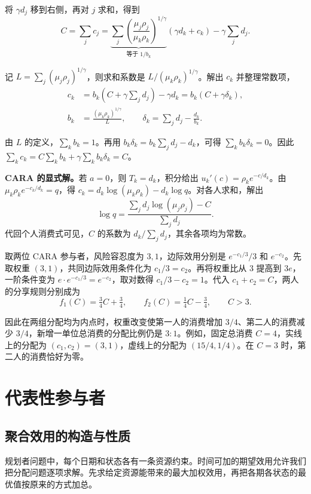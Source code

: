 将 $\gamma d_j$ 移到右侧，再对 $j$ 求和，得到
\[
 C=\sum_j c_j
 =\underbrace{\sum_j\left(\frac{\mu_j\rho_j}{\mu_k\rho_k}\right)^{1/\gamma}}
             _{\text{等于 }1/b_k}
       (\gamma d_k+c_k)-\gamma\sum_j d_j.
\]

记 $L=\sum_j(\mu_j\rho_j)^{1/\gamma}$，则求和系数是 $L/(\mu_k\rho_k)^{1/\gamma}$。解出 $c_k$ 并整理常数项，
\[
 \begin{aligned}
 c_k&=b_k\left(C+\gamma\sum_jd_j\right)-\gamma d_k
     =b_k(C+\gamma\delta_k),\\
 b_k&=\frac{(\mu_k\rho_k)^{1/\gamma}}{L},\qquad
 \delta_k=\sum_jd_j-\frac{d_k}{b_k}.
 \end{aligned}
\]

由 $L$ 的定义，$\sum_k b_k=1$。再用 $b_k\delta_k=b_k\sum_j d_j-d_k$，可得 $\sum_k b_k\delta_k=0$。因此 $\sum_k c_k=C\sum_k b_k+\gamma\sum_k b_k\delta_k=C$。

\textbf{CARA 的显式解。}若 $a=0$，则 $T_k=d_k$，积分给出 $u_k'(c)=\rho_k e^{-c/d_k}$。由 $\mu_k\rho_k e^{-c_k/d_k}=q$，得 $c_k=d_k\log(\mu_k\rho_k)-d_k\log q$。对各人求和，解出
\[
 \log q=\frac{\sum_jd_j\log(\mu_j\rho_j)-C}{\sum_jd_j}.
\]
代回个人消费式可见，$C$ 的系数为 $d_k/\sum_jd_j$，其余各项均为常数。

 取两位 CARA 参与者，风险容忍度为 $3,1$，边际效用分别是 $e^{-c_1/3}/3$ 和 $e^{-c_2}$。先取权重 $(3,1)$，共同边际效用条件化为 $c_1/3=c_2$。再将权重比从 $3$ 提高到 $3e$，一阶条件变为 $e\cdot e^{-c_1/3}=e^{-c_2}$，取对数得 $c_1/3-c_2=1$。代入 $c_1+c_2=C$，两人的分享规则分别成为
\[
 f_1(C)=\tfrac34 C+\tfrac34,\qquad
 f_2(C)=\tfrac14 C-\tfrac34,\qquad C>3.
\]

因此在两组分配均为内点时，权重改变使第一人的消费增加 $3/4$、第二人的消费减少 $3/4$，新增一单位总消费的分配比例仍是 $3:1$。例如，固定总消费 $C=4$，实线上的分配为 $(c_1,c_2)=(3,1)$，虚线上的分配为 $(15/4,1/4)$。在 $C=3$ 时，第二人的消费恰好为零。

\begingroup
\renewcommand{\thewjFigure}{\thechapter.S\arabic{wjFigure}}%
\endgroup

\section{代表性参与者}\label{sec:wj-ten-3}
\subsection{聚合效用的构造与性质}
规划者问题中，每个日期和状态各有一条资源约束。时间可加的期望效用允许我们把分配问题逐项求解。先求给定资源能带来的最大加权效用，再把各期各状态的最优值按原来的方式加总。

